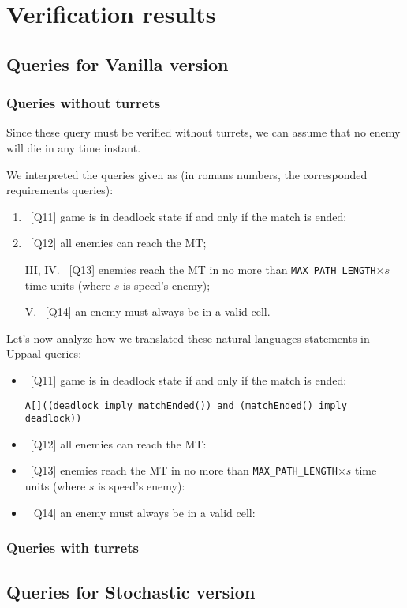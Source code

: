 \documentclass[
10pt, %
a4paper, %
oneside, %
headinclude,footinclude, %
BCOR5mm, %
]{scrartcl}
\begin{document}
\section{Verification results}
\subsection{Queries for Vanilla version}
\subsubsection{Queries without turrets}
Since these query must be verified without turrets, we can assume that no enemy will die in any time instant.

We interpreted the queries given as (in romans numbers, the corresponded requirements queries):
	\begin{enumerate}[label=\Roman*.]
		\item~[Q11] game is in deadlock state if and only if the match is ended;
		\item~[Q12] all enemies can reach the MT;
		\item[III, IV.]~[Q13] enemies reach the MT in no more than \texttt{MAX\_PATH\_LENGTH}$\times s$ time units (where $s$ is speed's enemy);
		\item[V.]~[Q14] an enemy must always be in a valid cell.
	\end{enumerate}

Let's now analyze how we translated these natural-languages statements in Uppaal queries:
\begin{itemize}
	\item~[Q11] game is in deadlock state if and only if the match is ended:
	
		\texttt{A[]((deadlock imply matchEnded()) and (matchEnded() imply deadlock))}
		
		
	\item~[Q12] all enemies can reach the MT:
	\item~[Q13] enemies reach the MT in no more than \texttt{MAX\_PATH\_LENGTH}$\times s$ time units (where $s$ is speed's enemy):
	\item~[Q14] an enemy must always be in a valid cell:
\end{itemize}

	

\subsubsection{Queries with turrets}
\subsection{Queries for Stochastic version}
\end{document}
